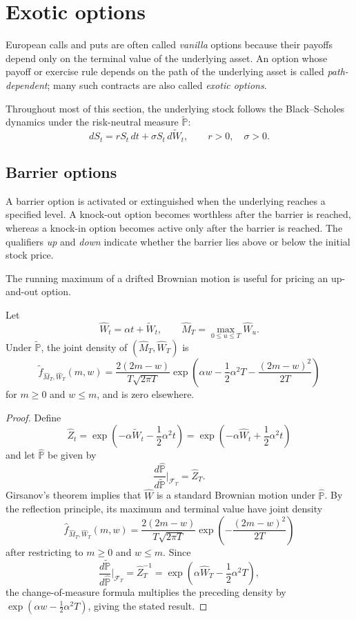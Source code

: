 \section{Exotic options}

European calls and puts are often called \emph{vanilla} options because their payoffs depend only on the terminal value of the underlying asset. An option whose payoff or exercise rule depends on the path of the underlying asset is called \emph{path-dependent}; many such contracts are also called \emph{exotic options}.

Throughout most of this section, the underlying stock follows the Black--Scholes dynamics under the risk-neutral measure $\widetilde{\mathbb{P}}$:
\[
dS_t=rS_t\,dt+\sigma S_t\,d\widetilde W_t,
\qquad r>0,
\quad \sigma>0.
\]

\subsection{Barrier options}

A barrier option is activated or extinguished when the underlying reaches a specified level. A knock-out option becomes worthless after the barrier is reached, whereas a knock-in option becomes active only after the barrier is reached. The qualifiers \emph{up} and \emph{down} indicate whether the barrier lies above or below the initial stock price.

The running maximum of a drifted Brownian motion is useful for pricing an up-and-out option.

\begin{thm}
Let
\[
\widehat W_t=\alpha t+\widetilde W_t,
\qquad
\widehat M_T=\max_{0\leq u\leq T}\widehat W_u.
\]
Under $\widetilde{\mathbb{P}}$, the joint density of $(\widehat M_T,\widehat W_T)$ is
\[
\widetilde f_{\widehat M_T,\widehat W_T}(m,w)
=\frac{2(2m-w)}{T\sqrt{2\pi T}}
 \exp\!\left(
 \alpha w-\frac12\alpha^2T-
 \frac{(2m-w)^2}{2T}
 \right)
\]
for $m\geq0$ and $w\leq m$, and is zero elsewhere.
\end{thm}

\begin{proof}
Define
\[
\widehat Z_t
=\exp\!\left(-\alpha\widetilde W_t-\frac12\alpha^2t\right)
=\exp\!\left(-\alpha\widehat W_t+\frac12\alpha^2t\right)
\]
and let $\widehat{\mathbb{P}}$ be given by
\[
\frac{d\widehat{\mathbb{P}}}{d\widetilde{\mathbb{P}}}
\bigg|_{\mathcal{F}_T}=\widehat Z_T.
\]
Girsanov's theorem implies that $\widehat W$ is a standard Brownian motion under $\widehat{\mathbb{P}}$. By the reflection principle, its maximum and terminal value have joint density
\[
\widehat f_{\widehat M_T,\widehat W_T}(m,w)
=\frac{2(2m-w)}{T\sqrt{2\pi T}}
 \exp\!\left(-\frac{(2m-w)^2}{2T}\right)
\]
after restricting to $m\geq0$ and $w\leq m$. Since
\[
\frac{d\widetilde{\mathbb{P}}}{d\widehat{\mathbb{P}}}
\bigg|_{\mathcal{F}_T}
=\widehat Z_T^{-1}
=\exp\!\left(\alpha\widehat W_T-\frac12\alpha^2T\right),
\]
the change-of-measure formula multiplies the preceding density by
$\exp(\alpha w-\frac12\alpha^2T)$, giving the stated result.
\end{proof}

